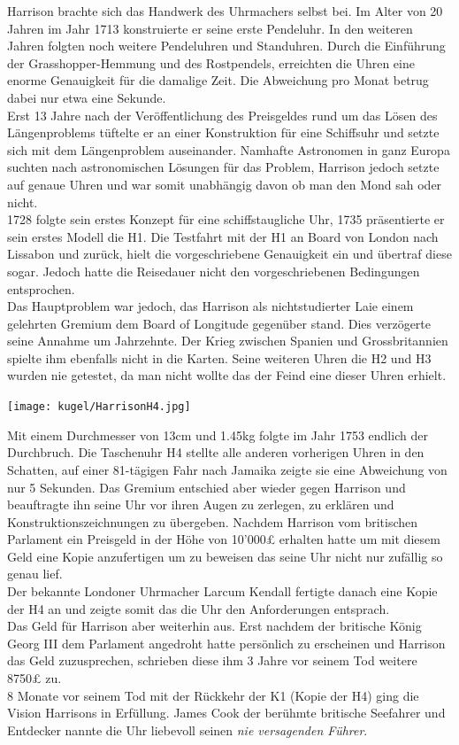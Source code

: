 \begin{refsection}
Harrison brachte sich das Handwerk des Uhrmachers selbst bei. Im Alter von 20 Jahren im Jahr 1713 konstruierte er seine erste Pendeluhr. In den weiteren Jahren folgten noch weitere Pendeluhren und Standuhren. Durch die Einführung der Grasshopper-Hemmung und des Rostpendels, erreichten die Uhren eine enorme Genauigkeit für die damalige Zeit. Die Abweichung pro Monat betrug dabei nur etwa eine Sekunde. \\
Erst 13 Jahre nach der Veröffentlichung des Preisgeldes rund um das Lösen des Längenproblems tüftelte er an einer Konstruktion für eine Schiffsuhr und setzte sich mit dem Längenproblem auseinander.
Namhafte Astronomen in ganz Europa suchten nach astronomischen Lösungen für das Problem, Harrison jedoch setzte auf genaue Uhren und war somit unabhängig davon ob man den Mond sah oder nicht.\\
1728 folgte sein erstes Konzept für eine schiffstaugliche Uhr, 1735 präsentierte er sein erstes Modell die H1.
Die Testfahrt mit der H1 an Board von London nach Lissabon und zurück, hielt die vorgeschriebene Genauigkeit ein und übertraf diese sogar. Jedoch hatte die Reisedauer nicht den vorgeschriebenen Bedingungen entsprochen.\\
Das Hauptproblem war jedoch, das Harrison als nichtstudierter Laie einem gelehrten Gremium dem Board of Longitude gegenüber stand. Dies verzögerte seine Annahme um Jahrzehnte. Der Krieg zwischen Spanien und Grossbritannien spielte ihm ebenfalls nicht in die Karten. Seine weiteren Uhren die H2 und H3 wurden nie getestet, da man nicht wollte das der Feind eine dieser Uhren erhielt.

\begin{center}
        \texttt{[image: kugel/HarrisonH4.jpg]}
\end{center}

Mit einem Durchmesser von 13cm und 1.45kg folgte im Jahr 1753 endlich der Durchbruch.
Die Taschenuhr H4 stellte alle anderen vorherigen Uhren in den Schatten, auf einer 81-tägigen Fahr nach Jamaika zeigte sie eine Abweichung von nur 5 Sekunden.
Das Gremium entschied aber wieder gegen Harrison und beauftragte ihn seine Uhr vor ihren Augen zu zerlegen, zu erklären und Konstruktionszeichnungen zu übergeben.
Nachdem Harrison vom britischen Parlament ein Preisgeld in der Höhe von 10’000£ erhalten hatte um mit diesem Geld eine Kopie anzufertigen um zu beweisen das seine Uhr nicht nur zufällig so genau lief.\\
Der bekannte  Londoner Uhrmacher Larcum Kendall fertigte danach eine Kopie der H4 an und zeigte somit das die Uhr den Anforderungen entsprach.\\
Das Geld für Harrison aber weiterhin aus. Erst nachdem der britische König Georg III dem Parlament angedroht hatte persönlich zu erscheinen und Harrison das Geld zuzusprechen, schrieben diese ihm 3 Jahre vor seinem Tod weitere 8750£ zu.\\
8 Monate vor seinem Tod mit der Rückkehr der K1 (Kopie der H4) ging die Vision Harrisons in Erfüllung. James Cook der berühmte britische Seefahrer und Entdecker nannte die Uhr liebevoll seinen \textit{nie versagenden Führer}.



\end{refsection}
